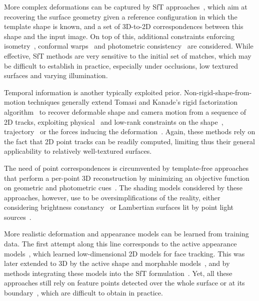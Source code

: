 \documentclass[10pt,twocolumn,letterpaper]{article}
\begin{document}
More complex deformations can be captured by SfT approaches~\cite{bartoli2015shape,chhatkuli2014stable,moreno2013stochastic,moreno2009capturing,ostlund2012laplacian,perriollat2011monocular, salzmann2009reconstructing,salzmann2008closed,vicente2012soft}, which aim at recovering the surface geometry given a reference configuration in which the template shape is known, and a set of 3D-to-2D correspondences between this shape and the input image. On top of this, additional constraints enforcing isometry~\cite{salzmann2008closed}, conformal warps~\cite{bartoli2015shape} and photometric consistency~\cite{moreno2013stochastic,moreno2009capturing} are considered. While effective, SfT methods are very sensitive to the initial set of  matches, which may be difficult to establish in practice, especially under occlusions, low textured surfaces  and varying illumination.






Temporal information is another typically exploited prior. Non-rigid-shape-from-motion techniques generally extend Tomasi and Kanade's rigid factorization algorithm~\cite{tomasi1992shape} to recover deformable shape and camera motion from a sequence of 2D tracks, exploiting physical~\cite{AgudoCVPR2015} and low-rank constraints on the shape~\cite{AgudoJMIV2016,AgudoCVPR2017,LeeCVPR:2014,TorresaniPAMI2008}, trajectory~\cite{AkhterPAMI2011} or the forces inducing the deformation~\cite{AgudoICCV2015}. Again, these methods rely on the fact that 2D point tracks can be readily computed, limiting thus their general applicability to relatively well-textured surfaces.

The need of point correspondences is circumvented by template-free approaches that perform a per-point 3D reconstruction by minimizing an objective function on geometric and photometric cues~\cite{balan2007shining,gorce2008model,wang2016template,white2006combining}. The shading models considered by these approaches, however, use to be oversimplifications of the reality, either considering brightness constancy~\cite{wang2016template} or Lambertian surfaces lit by point light sources~\cite{white2006combining}. 

 
More realistic deformation and appearance models can be learned from training data. The first attempt along this line corresponds to the active appearance models~\cite{cootes2001active}, which learned low-dimensional 2D models for face tracking. This was later extended to 3D by the active shape and morphable models~\cite{Blanz:etal:1999,matthews2004active}, and by methods integrating these models into the SfT formulation~\cite{moreno2011probabilistic}. Yet, all these approaches still rely on feature points detected over the whole surface or at its boundary~\cite{salzmann2008local}, which are difficult to obtain in practice. 
\end{document}
